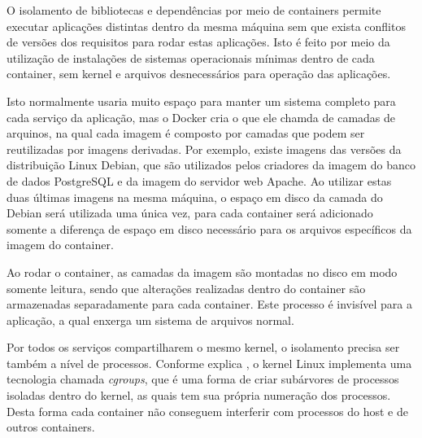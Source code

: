 O isolamento de bibliotecas e dependências por meio de containers permite
executar aplicações distintas dentro da mesma máquina sem que exista
conflitos de versões dos requisitos para rodar estas aplicações. Isto é feito
por meio da utilização de instalações de sistemas operacionais mínimas dentro
de cada container, sem kernel e arquivos desnecessários para operação das
aplicações.

Isto normalmente usaria muito espaço para manter um sistema completo para
cada serviço da aplicação, mas o Docker cria o que ele chamda de camadas
de arquinos, na qual cada imagem é composto por camadas que podem ser
reutilizadas por imagens derivadas. Por exemplo, existe imagens das
versões da distribuição Linux Debian, que são utilizados pelos criadores da
imagem do banco de dados PostgreSQL e da imagem do servidor web Apache.
Ao utilizar estas duas últimas imagens na mesma máquina, o espaço em disco
da camada do Debian será utilizada uma única vez, para cada container será
adicionado somente a diferença de espaço em disco necessário para os arquivos
específicos da imagem do container.

Ao rodar o container, as camadas da imagem são montadas no disco em modo
somente leitura, sendo que alterações realizadas dentro do container são
armazenadas separadamente para cada container. Este processo é invisível para
a aplicação, a qual enxerga um sistema de arquivos normal.

Por todos os serviços compartilharem o mesmo kernel, o isolamento precisa
ser também a nível de processos. Conforme explica ,
o kernel Linux implementa uma tecnologia chamada \emph{cgroups}, que é uma
forma de criar subárvores de processos isoladas dentro do kernel, as quais
tem sua própria numeração dos processos. Desta forma cada container não
conseguem interferir com processos do host e de outros containers.
